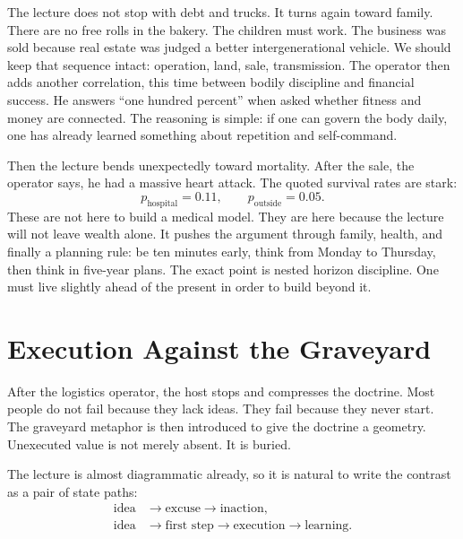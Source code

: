 The lecture does not stop with debt and trucks. It turns again toward family. There are no free rolls in the bakery. The children must work. The business was sold because real estate was judged a better intergenerational vehicle. We should keep that sequence intact: operation, land, sale, transmission. The operator then adds another correlation, this time between bodily discipline and financial success. He answers ``one hundred percent'' when asked whether fitness and money are connected. The reasoning is simple: if one can govern the body daily, one has already learned something about repetition and self-command.

Then the lecture bends unexpectedly toward mortality. After the sale, the operator says, he had a massive heart attack. The quoted survival rates are stark:
\begin{equation}
p_{\text{hospital}}=0.11,\qquad
p_{\text{outside}}=0.05.
\end{equation}
These are not here to build a medical model. They are here because the lecture will not leave wealth alone. It pushes the argument through family, health, and finally a planning rule: be ten minutes early, think from Monday to Thursday, then think in five-year plans. The exact point is nested horizon discipline. One must live slightly ahead of the present in order to build beyond it.

\section{Execution Against the Graveyard}

After the logistics operator, the host stops and compresses the doctrine. Most people do not fail because they lack ideas. They fail because they never start. The graveyard metaphor is then introduced to give the doctrine a geometry. Unexecuted value is not merely absent. It is buried.

The lecture is almost diagrammatic already, so it is natural to write the contrast as a pair of state paths:
\begin{align}
\text{idea} &\to \text{excuse} \to \text{inaction},\\
\text{idea} &\to \text{first step} \to \text{execution} \to \text{learning}.
\end{align}

